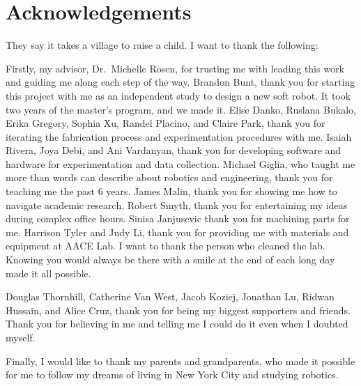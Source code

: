\section*{Acknowledgements}

They say it takes a village to raise a child. I want to thank the following:

Firstly, my advisor, Dr.~Michelle Rosen, for trusting me with leading this work and guiding me along each step of the way. Brandon Bunt, thank you for starting this project with me as an independent study to design a new soft robot. It took two years of the master's program, and we made it. Elise Danko, Ruslana Bukalo, Erika Gregory, Sophia Xu, Randel Placino, and Claire Park, thank you for iterating the fabrication process and experimentation procedures with me. Isaiah Rivera, Joya Debi, and Ani Vardanyan, thank you for developing software and hardware for experimentation and data collection. Michael Giglia, who taught me more than words can describe about robotics and engineering, thank you for teaching me the past 6 years. James Malin, thank you for showing me how to navigate academic research. Robert Smyth, thank you for entertaining my ideas during complex office hours. Sinisa Janjusevic thank you for machining parts for me. Harrison Tyler and Judy Li, thank you for providing me with materials and equipment at AACE Lab. I want to thank the person who cleaned the lab. Knowing you would always be there with a smile at the end of each long day made it all possible. 

Douglas Thornhill, Catherine Van West, Jacob Koziej, Jonathan Lu, Ridwan Hussain, and Alice Cruz, thank you for being my biggest supporters and friends. Thank you for believing in me and telling me I could do it even when I doubted myself.

Finally, I would like to thank my parents and grandparents, who made it possible for me to follow my dreams of living in New York City and studying robotics. 